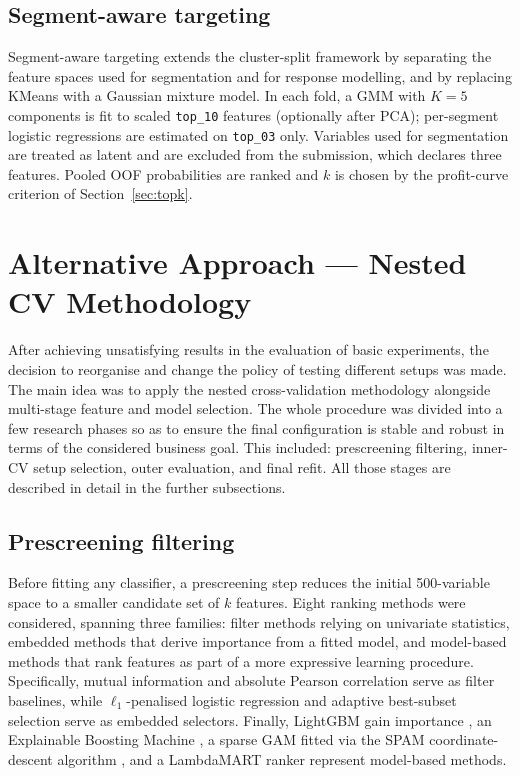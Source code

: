 \documentclass[cameraready]{Interspeech}
\begin{document}
\subsection{Segment-aware targeting}
\label{sec:segment}

Segment-aware targeting extends the cluster-split framework by separating the feature spaces used for segmentation and for response modelling, and by replacing KMeans with a Gaussian mixture model.
In each fold, a GMM with $K{=}5$ components is fit to scaled \texttt{top\_10} features (optionally after PCA); per-segment logistic regressions are estimated on \texttt{top\_03} only.
Variables used for segmentation are treated as latent and are excluded from the submission, which declares three features.
Pooled OOF probabilities are ranked and $k$ is chosen by the profit-curve criterion of Section~\ref{sec:topk}.

\section{Alternative Approach --- Nested CV Methodology}
\label{sec:nested}

After achieving unsatisfying results in the evaluation of basic experiments,
the decision to reorganise and change the policy of testing different setups was made.
The main idea was to apply the nested cross-validation methodology alongside multi-stage
feature and model selection. The whole procedure was divided into a few research phases
so as to ensure the final configuration is stable and robust in terms of the considered business goal.
This included: prescreening filtering, inner-CV setup selection, outer evaluation, and final refit.
All those stages are described in detail in the further subsections.

\subsection{Prescreening filtering}
\label{sec:prescreening}

Before fitting any classifier, a prescreening step reduces the initial 500-variable space to a smaller candidate set of $k$ features.
Eight ranking methods were considered, spanning three families: filter methods relying on
univariate statistics, embedded methods that derive importance from a fitted model, and
model-based methods that rank features as part of a more expressive learning procedure.
Specifically, mutual information \cite{peng2005feature} and absolute Pearson correlation
\cite{guyon2003introduction} serve as filter baselines, while $\ell_1$-penalised logistic
regression \cite{tibshirani1996lasso} and adaptive best-subset selection
\cite{zhu2022abess} serve as embedded selectors. Finally, LightGBM gain importance
\cite{ke2017lightgbm}, an Explainable Boosting Machine \cite{lou2012intelligible},
a sparse GAM fitted via the SPAM coordinate-descent algorithm \cite{ravikumar2009spam},
and a LambdaMART ranker \cite{burges2010lambdamart} represent model-based methods.
\end{document}
